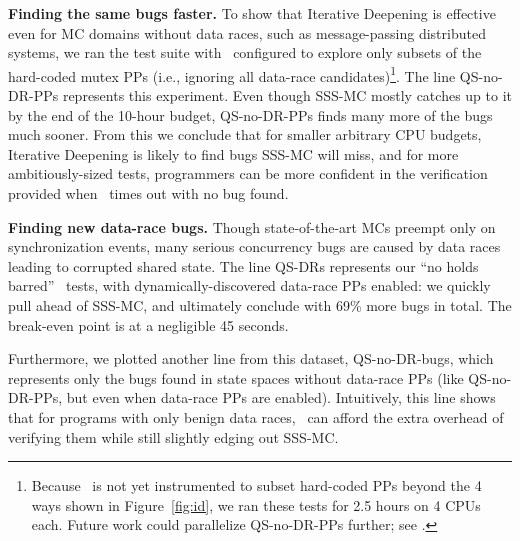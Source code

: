 {\bf Finding the same bugs faster.}
To show that Iterative Deepening is effective even for MC domains without data races, such as message-passing distributed systems,
we ran the test suite with \quicksand~configured to explore only subsets of the hard-coded mutex PPs
(i.e., ignoring all data-race candidates)\footnote{
Because \quicksand~is not yet instrumented to subset hard-coded PPs beyond the 4 ways shown in Figure~\ref{fig:id},
we ran these tests for 2.5 hours on 4 CPUs each.
Future work could parallelize QS-no-DR-PPs further; see \sect{\ref{sec:future}}.}.
%
The line QS-no-DR-PPs represents this experiment.
Even though SSS-MC mostly catches up to it by the end of the 10-hour budget,
QS-no-DR-PPs finds many more of the bugs much sooner.
From this we conclude that for smaller arbitrary CPU budgets,
Iterative Deepening is likely to find bugs SSS-MC will miss,
and for more ambitiously-sized tests,
programmers can be more confident in the verification provided when \quicksand~times out with no bug found.


{\bf Finding new data-race bugs.}
Though state-of-the-art MCs preempt only on synchronization events, many serious concurrency bugs are caused by data races leading to corrupted shared state.
The line QS-DRs represents our ``no holds barred'' \quicksand~tests,
with dynamically-discovered data-race PPs enabled:
we quickly pull ahead of SSS-MC, and ultimately conclude with 69\% more bugs in total.
The break-even point is at a negligible 45 seconds.

Furthermore, we plotted another line from this dataset, QS-no-DR-bugs,
which represents only the bugs found in state spaces without data-race PPs (like QS-no-DR-PPs, but even when data-race PPs are enabled).
Intuitively, this line shows that for programs with only benign data races,
\quicksand~can afford the extra overhead of verifying them while still slightly edging out SSS-MC.

